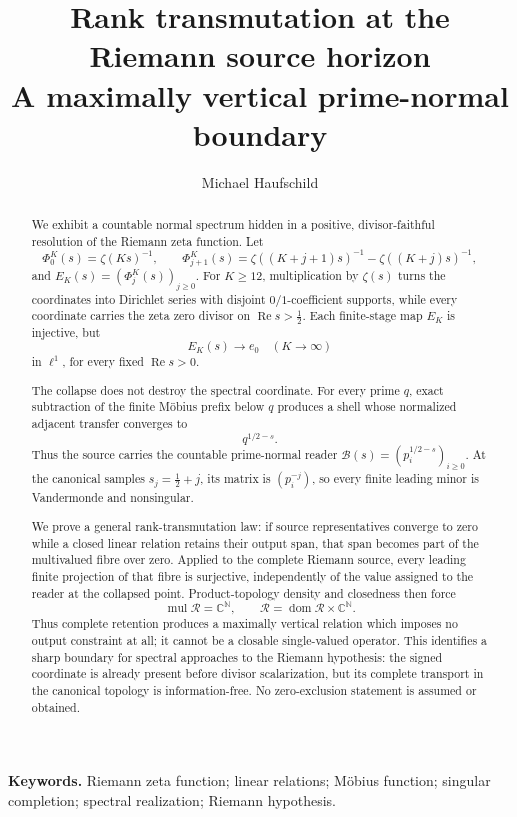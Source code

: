 \documentclass[11pt]{article}
\title{\textbf{Rank transmutation at the Riemann source horizon}\\
\large A maximally vertical prime-normal boundary}
\author{Michael Haufschild}
\date{}
\theoremstyle{definition}
\theoremstyle{remark}
\newcommand{\C}{\mathbb C}
\newcommand{\N}{\mathbb N}
\newcommand{\cR}{\mathcal R}
\newcommand{\cB}{\mathcal B}
\newcommand{\Rea}{\operatorname{Re}}
\newcommand{\mul}{\operatorname{mul}}
\begin{document}
\maketitle

\begin{abstract}
We exhibit a countable normal spectrum hidden in a positive, divisor-faithful
resolution of the Riemann zeta function.  Let
\[
 \Phi^K_0(s)=\zeta(Ks)^{-1},\qquad
 \Phi^K_{j+1}(s)=\zeta((K+j+1)s)^{-1}-\zeta((K+j)s)^{-1},
\]
and \(E_K(s)=(\Phi^K_j(s))_{j\geq0}\).  For \(K\geq12\), multiplication by
\(\zeta(s)\) turns the coordinates into Dirichlet series with disjoint
\(0/1\)-coefficient supports, while every coordinate carries the zeta zero
divisor on \(\Rea s>\tfrac12\).  Each finite-stage map \(E_K\) is injective,
but
\[
                         E_K(s)\longrightarrow e_0\quad(K\to\infty)
\]
in \(\ell^1\), for every fixed \(\Rea s>0\).

The collapse does not destroy the spectral coordinate.  For every prime \(q\),
exact subtraction of the finite M\"obius prefix below \(q\) produces a shell
whose normalized adjacent transfer converges to
\[
                              q^{1/2-s}.
\]
Thus the source carries the countable prime-normal reader
\(\cB(s)=(p_i^{1/2-s})_{i\geq0}\).  At the canonical samples
\(s_j=\tfrac12+j\), its matrix is \((p_i^{-j})\), so every finite leading
minor is Vandermonde and nonsingular.

We prove a general rank-transmutation law: if source representatives converge
to zero while a closed linear relation retains their output span, that span
becomes part of the multivalued fibre over zero.  Applied to the complete
Riemann source, every leading finite projection of that fibre is surjective,
independently of the value assigned to the reader at the collapsed point.
Product-topology density and closedness then force
\[
                    \mul\cR=\C^\N,\qquad
                    \cR=\operatorname{dom}\cR\times\C^\N.
\]
Thus complete retention produces a maximally vertical relation which imposes
no output constraint at all; it cannot be a closable single-valued operator.
This identifies a sharp boundary for spectral approaches to the Riemann
hypothesis: the signed coordinate is already present before divisor
scalarization, but its complete transport in the canonical topology is
information-free.  No zero-exclusion statement is assumed or obtained.
\end{abstract}

\medskip
\noindent\textbf{Keywords.}
Riemann zeta function; linear relations; M\"obius function; singular
completion; spectral realization; Riemann hypothesis.
\end{document}
